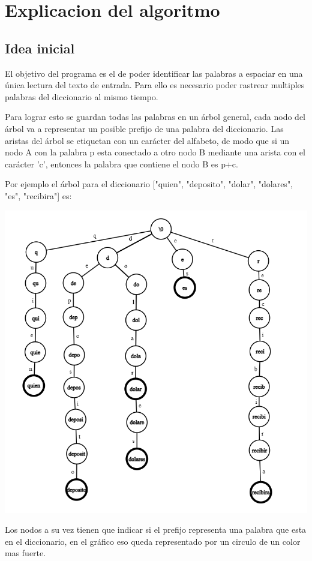 \documentclass{article}
\begin{document}
\section*{Explicacion del algoritmo}

\subsection*{Idea inicial}
El objetivo del programa es el de poder identificar las palabras a espaciar en una única lectura del texto de entrada.
Para ello es necesario poder rastrear multiples palabras del diccionario al mismo tiempo.

Para lograr esto se guardan todas las palabras en un árbol general, cada nodo del árbol va a representar un posible
prefijo de una palabra del diccionario. Las aristas del árbol se etiquetan con un carácter del alfabeto, de modo que si
un nodo A con la palabra p esta conectado a otro nodo B mediante una arista con el carácter 'c', entonces la palabra
que contiene el nodo B es p+c.

Por ejemplo el árbol para el diccionario ["quien", "deposito", "dolar", "dolares", "es", "recibira"] es:

\includegraphics[scale=0.3]{trie1.png}

Los nodos a su vez tienen que indicar si el prefijo representa una palabra que esta en el diccionario, en el gráfico
eso queda representado por un circulo de un color mas fuerte.
\end{document}
